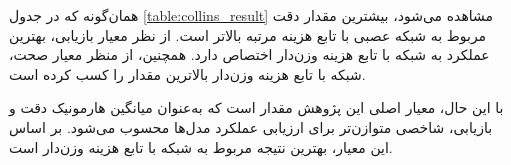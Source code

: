 همان‌گونه که در جدول \ref{table:collins_result} مشاهده می‌شود، بیشترین مقدار دقت مربوط به شبکه عصبی  با تابع هزینه  مرتبه بالاتر است. از نظر معیار بازیابی، بهترین عملکرد به شبکه  با تابع هزینه  وزن‌دار اختصاص دارد. همچنین، از منظر معیار صحت، شبکه  با تابع هزینه  وزن‌دار بالاترین مقدار را کسب کرده است. 

با این حال، معیار اصلی این پژوهش مقدار  است که به‌عنوان میانگین هارمونیک دقت و بازیابی، شاخصی متوازن‌تر برای ارزیابی عملکرد مدل‌ها محسوب می‌شود. بر اساس این معیار، بهترین نتیجه مربوط به شبکه  با تابع هزینه  وزن‌دار است.

\begin{table}[h]
	\centering
	\caption{نتایج عملکرد شبکه عصبی و تابع هزینه برای مجموعه داده }
	\label{table:krogan_result}
	\vspace{3mm}
	
\end{table} 

